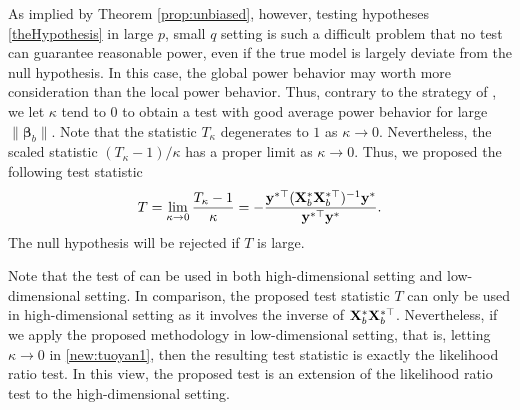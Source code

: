 \documentclass[smallextended]{svjour3}       %
\newcommand{\By}{\mathbf{y}}    \newcommand{\Bz}{\mathbf{z}}
\newcommand{\bfsym}[1]{\ensuremath{\boldsymbol{#1}}}
\def\bbeta{\bfsym \beta}
\begin{document}
As implied by Theorem \ref{prop:unbiased}, however, testing hypotheses \eqref{theHypothesis} in large $p$, small $q$ setting is such a difficult problem that no test can guarantee reasonable power, even if the true model is largely deviate from the null hypothesis.
In this case, the global power behavior may worth more consideration than the local power behavior.
Thus, contrary to the strategy of \cite{Goeman2006}, we let $\kappa$ tend to $0$ to obtain a test with good average power behavior for large $\|\bbeta_b\|$.
Note that the statistic $ T_{\kappa}$ degenerates to $1$ as $\kappa\to 0$.
Nevertheless, the scaled statistic $(T_{\kappa}-1)/\kappa$ has a proper limit as $\kappa\to 0$.
Thus, we proposed the following test statistic
\begin{equation*}
    T
    =
    \lim_{\kappa\to 0} \frac{T_{\kappa}-1}{\kappa}
    =
    -
     \frac{\By^{*\top} ( \BX_b^* \BX_b^{*\top} )^{-1} \By^* }{\By^{*\top} \By^*} .
\end{equation*}
The null hypothesis will be rejected if $T$ is large.

Note that the test of \cite{Goeman2006} can be used in both high-dimensional setting and low-dimensional setting.
In comparison, the proposed test statistic $T$ can only be used in high-dimensional setting as it involves the inverse of $ \mathbf{X}_b^* \mathbf{X}_b^{*\top}$. 
Nevertheless, if we apply the proposed methodology in low-dimensional setting, that is, letting $\kappa \to 0$ in \eqref{new:tuoyan1}, then the resulting test statistic is exactly the likelihood ratio test.
In this view, the proposed test is an extension of the likelihood ratio test to the high-dimensional setting.
\end{document}

